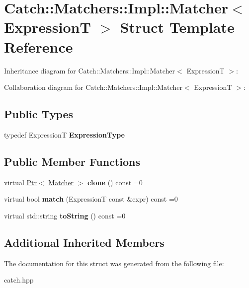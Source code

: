\hypertarget{struct_catch_1_1_matchers_1_1_impl_1_1_matcher}{}\section{Catch\+:\+:Matchers\+:\+:Impl\+:\+:Matcher$<$ ExpressionT $>$ Struct Template Reference}
\label{struct_catch_1_1_matchers_1_1_impl_1_1_matcher}


Inheritance diagram for Catch\+:\+:Matchers\+:\+:Impl\+:\+:Matcher$<$ ExpressionT $>$\+:


Collaboration diagram for Catch\+:\+:Matchers\+:\+:Impl\+:\+:Matcher$<$ ExpressionT $>$\+:
\subsection*{Public Types}
\begin{DoxyCompactItemize}
\item 
\mbox{\label{struct_catch_1_1_matchers_1_1_impl_1_1_matcher_a7f5068cbacd1eed06cf243e63446e7e1}} 
typedef ExpressionT {\bfseries Expression\+Type}
\end{DoxyCompactItemize}
\subsection*{Public Member Functions}
\begin{DoxyCompactItemize}
\item 
\mbox{\label{struct_catch_1_1_matchers_1_1_impl_1_1_matcher_a9d31e5018fea24efa08c3cbf5aa4475d}} 
virtual \hyperlink{class_catch_1_1_ptr}{Ptr}$<$ \hyperlink{struct_catch_1_1_matchers_1_1_impl_1_1_matcher}{Matcher} $>$ {\bfseries clone} () const =0
\item 
\mbox{\label{struct_catch_1_1_matchers_1_1_impl_1_1_matcher_a8c1c5511ce1f3738a45e6901b558f583}} 
virtual bool {\bfseries match} (ExpressionT const \&expr) const =0
\item 
\mbox{\label{struct_catch_1_1_matchers_1_1_impl_1_1_matcher_a091bcc37e589967d7e10fc7790d820e2}} 
virtual std\+::string {\bfseries to\+String} () const =0
\end{DoxyCompactItemize}
\subsection*{Additional Inherited Members}


The documentation for this struct was generated from the following file\+:\begin{DoxyCompactItemize}
\item 
catch.\+hpp\end{DoxyCompactItemize}
